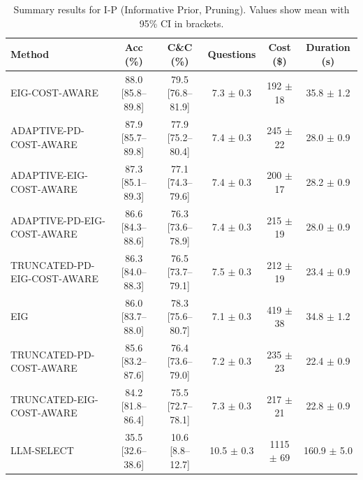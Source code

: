 \begin{table}[htbp]
\centering
\small
\caption{Summary results for I-P (Informative Prior, Pruning). Values show mean with 95\% CI in brackets.}
\label{tab:results-prune_notuniform}
\begin{tabular}{@{}lccccc@{}}
\toprule
Method & Acc (\%) & C\&C (\%) & Questions & Cost (\$) & Duration (s) \\
\midrule
EIG-COST-AWARE & 88.0 [85.8--89.8] & 79.5 [76.8--81.9] & 7.3 $\pm$ 0.3 & 192 $\pm$ 18 & 35.8 $\pm$ 1.2 \\
ADAPTIVE-PD-COST-AWARE & 87.9 [85.7--89.8] & 77.9 [75.2--80.4] & 7.4 $\pm$ 0.3 & 245 $\pm$ 22 & 28.0 $\pm$ 0.9 \\
ADAPTIVE-EIG-COST-AWARE & 87.3 [85.1--89.3] & 77.1 [74.3--79.6] & 7.4 $\pm$ 0.3 & 200 $\pm$ 17 & 28.2 $\pm$ 0.9 \\
ADAPTIVE-PD-EIG-COST-AWARE & 86.6 [84.3--88.6] & 76.3 [73.6--78.9] & 7.4 $\pm$ 0.3 & 215 $\pm$ 19 & 28.0 $\pm$ 0.9 \\
TRUNCATED-PD-EIG-COST-AWARE & 86.3 [84.0--88.3] & 76.5 [73.7--79.1] & 7.5 $\pm$ 0.3 & 212 $\pm$ 19 & 23.4 $\pm$ 0.9 \\
EIG & 86.0 [83.7--88.0] & 78.3 [75.6--80.7] & 7.1 $\pm$ 0.3 & 419 $\pm$ 38 & 34.8 $\pm$ 1.2 \\
TRUNCATED-PD-COST-AWARE & 85.6 [83.2--87.6] & 76.4 [73.6--79.0] & 7.2 $\pm$ 0.3 & 235 $\pm$ 23 & 22.4 $\pm$ 0.9 \\
TRUNCATED-EIG-COST-AWARE & 84.2 [81.8--86.4] & 75.5 [72.7--78.1] & 7.3 $\pm$ 0.3 & 217 $\pm$ 21 & 22.8 $\pm$ 0.9 \\
LLM-SELECT & 35.5 [32.6--38.6] & 10.6 [8.8--12.7] & 10.5 $\pm$ 0.3 & 1115 $\pm$ 69 & 160.9 $\pm$ 5.0 \\
\bottomrule
\end{tabular}
\end{table}